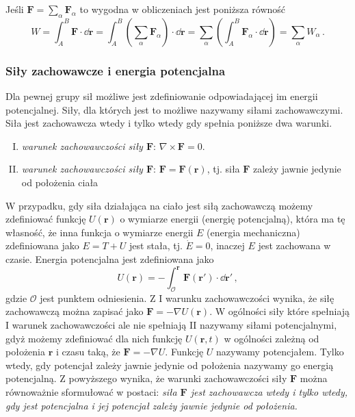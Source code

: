 \documentclass[../main.tex]{subfiles}
\begin{document}
\noindent{}
\medskip

Jeśli \(\mathbf{F}=\sum_\alpha\mathbf{F}_\alpha\) to wygodna w obliczeniach jest poniższa równość
\begin{equation*}
    W=\int_{A}^B\mathbf{F}\cdot \dd\mathbf{r}=\int_{A}^B\left(\sum_\alpha\mathbf{F}_\alpha\right)\cdot \dd\mathbf{r}=\sum_\alpha\left(\int_A^B \mathbf{F}_\alpha\cdot \dd\mathbf{r}\right)=\sum_\alpha W_\alpha\,.
\end{equation*}
\subsubsection{Siły zachowawcze i energia potencjalna}
Dla pewnej grupy sił możliwe jest zdefiniowanie odpowiadającej im energii potencjalnej. Siły, dla których jest to możliwe nazywamy siłami zachowawczymi. Siła jest zachowawcza wtedy i tylko wtedy gdy spełnia poniższe dwa warunki.
\begin{enumerate}[I.]
    \item \textit{warunek zachowawczości siły \(\mathbf{F}\)}: \(\nabla\times\mathbf{F}=0\).
    \item \textit{warunek zachowawczości siły \(\mathbf{F}\)}: \(\mathbf{F}=\mathbf{F}(\mathbf{r})\), tj. siła \(\mathbf{F}\) zależy jawnie jedynie od położenia ciała 
\end{enumerate}
W przypadku, gdy siła działająca na ciało jest siłą zachowawczą możemy zdefiniować funkcję \(U(\mathbf{r})\) o wymiarze energii (energię potencjalną), która ma tę własność, że inna funkcja o wymiarze energii \(E\) (energia mechaniczna) zdefiniowana jako \(E=T+U\) jest stała, tj. \(\dot E=0\), inaczej \(E\) jest zachowana w czasie. Energia potencjalna jest zdefiniowana jako
\begin{equation*}
    U(\mathbf{r})=-\int_{\mathcal{O}}^\mathbf{r}\mathbf{F}(\mathbf{r}')\cdot \dd\mathbf{r}'\,,
\end{equation*}
gdzie \(\mathcal{O}\) jest punktem odniesienia. Z I warunku zachowawczości wynika, że siłę zachowawczą można zapisać jako \(\mathbf{F}=-\nabla U(\mathbf{r})\). W ogólności siły które spełniają I warunek zachowawczości ale nie spełniają II nazywamy siłami potencjalnymi, gdyż możemy zdefiniować dla nich funkcję \(U(\mathbf{r},t)\) w ogólności zależną od położenia \(\mathbf{r}\) i czasu taką, że \(\mathbf{F}=-\nabla U\). Funkcję \(U\) nazywamy potencjałem. Tylko wtedy, gdy potencjał zależy jawnie jedynie od położenia nazywamy go energią potencjalną. Z powyższego wynika, że warunki zachowawczości siły \(\mathbf{F}\) można równoważnie sformułować w postaci: \textit{siła \(\mathbf{F}\) jest zachowawcza wtedy i tylko wtedy, gdy jest potencjalna i jej potencjał zależy jawnie jedynie od położenia.}
\end{document}
